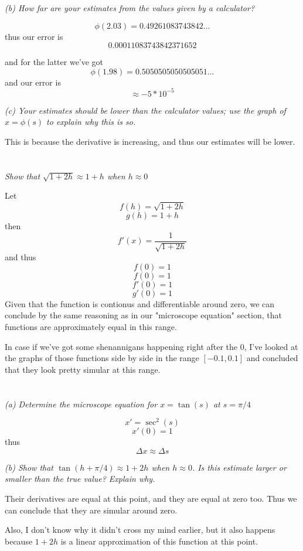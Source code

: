 \documentclass[11pt,oneside,titlepage]{book}
\begin{document}
\textit{(b) How far are your estimates from the values given by a calculator?}

$$\phi(2.03) = 0.49261083743842...$$
thus our error is
$$0.00011083743842371652$$

and for the latter we've got
$$\phi(1.98) = 0.5050505050505051...$$
and our error is
$$\approx -5 * 10^{-5}$$

\textit{(c) Your estimates should be lower than the calculator values; use the graph of
  $x = \phi(s)$ to explain why this is so.}

This is because the derivative is increasing, and thus our estimates will be lower.


\section{}

\textit{Show that $\sqrt{1 + 2h} \approx 1 + h$ when $h \approx 0$}

Let
$$f(h) = \sqrt{1 + 2h}$$
$$g(h) = 1 + h$$
then
$$f'(x) = \frac{1}{\sqrt{1 + 2h}}$$
and thus
$$f(0) = 1$$
$$f(0) = 1$$
$$f'(0) = 1$$
$$g'(0) = 1$$
Given that the function is contionus and differentiable around zero, we can conclude by the
same reasoning as in our  "microscope equation" section, that functions are approximately
equal in this range.

In case if we've got some shenannigans happening right after the 0, I've looked at the graphs
of those functions side by side in the range $[-0.1, 0.1]$ and concluded that they look pretty
simular at this range.

\section{}

\textit{(a) Determine the microscope equation for $x = \tan(s)$ at $s = \pi/4$}

$$x' = \sec^2(s)$$
$$x'(0) = 1$$
thus
$$\Delta x \approx \Delta s$$

\textit{(b) Show that $\tan(h + \pi/4) \approx 1 + 2h$ when $h \approx 0$. Is this estimate larger
  or smaller than the true value? Explain why.}

Their derivatives are equal at this point, and they are equal at zero too. Thus we can conclude
that they are simular around zero.

Also, I don't know why it didn't cross my mind earlier, but it also happens
because $1 + 2h$ is a linear approximation of this function at this point.
\end{document}
